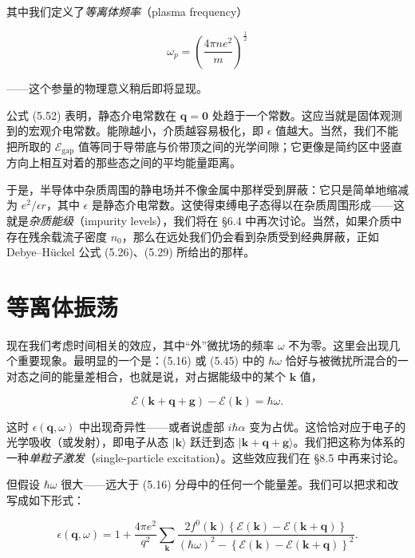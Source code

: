 其中我们定义了\emph{等离体频率}（plasma frequency）

\begin{equation*}
\omega_p = \left( \frac{4\pi n e^2}{m} \right)^{\frac{1}{2}}
\tag{5.53}
\end{equation*}

——这个参量的物理意义稍后即将显现。

公式 (5.52) 表明，静态介电常数在 $\mathbf{q} = \mathbf{0}$ 处趋于一个常数。这应当就是固体观测到的宏观介电常数。能隙越小，介质越容易极化，即 $\epsilon$ 值越大。当然，我们不能把所取的 $\mathcal{E}_{\mathrm{gap}}$ 值等同于导带底与价带顶之间的光学间隙；它更像是简约区中竖直方向上相互对着的那些态之间的平均能量距离。

于是，半导体中杂质周围的静电场并不像金属中那样受到屏蔽：它只是简单地缩减为 $e^2/\epsilon r$，其中 $\epsilon$ 是静态介电常数。这使得束缚电子态得以在杂质周围形成——这就是\emph{杂质能级}（impurity levels），我们将在 §6.4 中再次讨论。当然，如果介质中存在残余载流子密度 $n_0$，那么在远处我们仍会看到杂质受到经典屏蔽，正如 Debye--Hückel 公式 (5.26)、(5.29) 所给出的那样。

\section{等离体振荡}

现在我们考虑时间相关的效应，其中“外”微扰场的频率 $\omega$ 不为零。这里会出现几个重要现象。最明显的一个是：(5.16) 或 (5.45) 中的 $\hbar\omega$ 恰好与被微扰所混合的一对态之间的能量差相合，也就是说，对占据能级中的某个 $\mathbf{k}$ 值，

\begin{equation*}
\mathcal{E}(\mathbf{k}+\mathbf{q}+\mathbf{g}) - \mathcal{E}(\mathbf{k}) = \hbar\omega .
\tag{5.54}
\end{equation*}

这时 $\epsilon(\mathbf{q},\omega)$ 中出现奇异性——或者说虚部 $i\hbar\alpha$ 变为占优。这恰恰对应于电子的光学吸收（或发射），即电子从态 $|\mathbf{k}\rangle$ 跃迁到态 $|\mathbf{k}+\mathbf{q}+\mathbf{g}\rangle$。我们把这称为体系的一种\emph{单粒子激发}（single-particle excitation）。这些效应我们在 §8.5 中再来讨论。

但假设 $\hbar\omega$ 很大——远大于 (5.16) 分母中的任何一个能量差。我们可以把求和改写成如下形式：

\begin{equation*}
\epsilon(\mathbf{q},\omega) = 1 + \frac{4\pi e^2}{q^2} \sum_{\mathbf{k}} \frac{2f^0(\mathbf{k}) \left\{ \mathcal{E}(\mathbf{k}) - \mathcal{E}(\mathbf{k}+\mathbf{q}) \right\}}{(\hbar\omega)^2 - \left\{ \mathcal{E}(\mathbf{k}) - \mathcal{E}(\mathbf{k}+\mathbf{q}) \right\}^2} .
\tag{5.55}
\end{equation*}

